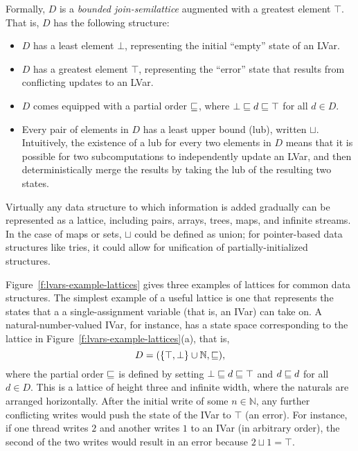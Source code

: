 Formally, $D$ is a \emph{bounded join-semilattice} augmented with a
greatest element $\top$.  That is, $D$ has the following structure:
\begin{itemize}
\item $D$ has a least element $\bot$, representing the initial
  ``empty'' state of an LVar.
\item $D$ has a greatest element $\top$, representing the ``error''
  state that results from conflicting updates to an LVar.
\item $D$ comes equipped with a partial order $\sqsubseteq$, where $\bot
  \sqsubseteq d \sqsubseteq \top$ for all $d \in D$.
\item Every pair of elements in $D$ has a least upper bound (lub),
  written $\sqcup$.  Intuitively, the existence of a lub for every two
  elements in $D$ means that it is possible for two subcomputations to
  independently update an LVar, and then deterministically merge the
  results by taking the lub of the resulting two states.
\end{itemize}

Virtually any data structure to which information is added gradually
can be represented as a lattice, including pairs, arrays, trees, maps,
and infinite streams.  In the case of maps or sets, $\sqcup$ could be
defined as union; for pointer-based data structures like tries, it
could allow for unification of partially-initialized structures.

Figure~\ref{f:lvars-example-lattices} gives three examples of lattices
for common data structures.  The simplest example of a useful
lattice is one that represents the states that a a single-assignment
variable (that is, an IVar) can take on.  A natural-number-valued
IVar, for instance, has a state space corresponding to the lattice in
Figure~\ref{f:lvars-example-lattices}(a), that is,
\begin{displaymath}
  D = (\lbrace \top, \bot \rbrace \cup \mathbb{N}, \sqsubseteq), 
\end{displaymath}
where the partial order $\sqsubseteq$ is defined by setting $\bot
\sqsubseteq d \sqsubseteq \top$ and $d \sqsubseteq d$ for all $d \in D$.  This
is a lattice of height three and infinite width, where the naturals
are arranged horizontally.  After the initial write of some $n \in
\mathbb{N}$, any further conflicting writes would push the state of
the IVar to $\top$ (an error).  For instance, if one thread writes $2$
and another writes $1$ to an IVar (in arbitrary order), the second of
the two writes would result in an error because $2 \sqcup 1 = \top$.

